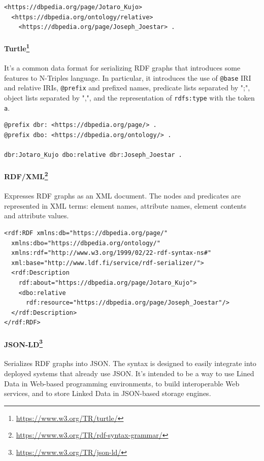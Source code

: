 \begin{verbatim}
<https://dbpedia.org/page/Jotaro_Kujo>
  <https://dbpedia.org/ontology/relative>
    <https://dbpedia.org/page/Joseph_Joestar> .
\end{verbatim}

\paragraph*{Turtle\footnote{\url{https://www.w3.org/TR/turtle/}}} It's a common data format for serializing \ac{RDF} graphs that introduces some features to N-Triples language. In particular, it introduces the use of \texttt{@base} \ac{IRI} and relative \acp{IRI}, \texttt{@prefix} and prefixed names, predicate lists separated by ";", object lists separated by ",", and the representation of \texttt{rdfs:type} with the token \texttt{a}.

\begin{verbatim}
@prefix dbr: <https://dbpedia.org/page/> .
@prefix dbo: <https://dbpedia.org/ontology/> .

dbr:Jotaro_Kujo dbo:relative dbr:Joseph_Joestar .
\end{verbatim}

\paragraph*{RDF/XML\footnote{\url{https://www.w3.org/TR/rdf-syntax-grammar/}}} Expresses \ac{RDF} graphs as an \acs{XML} document. The nodes and predicates are represented in \acs{XML} terms: element names, attribute names, element contents and attribute values.

\begin{verbatim}
<rdf:RDF xmlns:db="https://dbpedia.org/page/"
  xmlns:dbo="https://dbpedia.org/ontology/"
  xmlns:rdf="http://www.w3.org/1999/02/22-rdf-syntax-ns#"
  xml:base="http://www.ldf.fi/service/rdf-serializer/">
  <rdf:Description
    rdf:about="https://dbpedia.org/page/Jotaro_Kujo">
    <dbo:relative
      rdf:resource="https://dbpedia.org/page/Joseph_Joestar"/>
  </rdf:Description>
</rdf:RDF>    
\end{verbatim}

\paragraph*{JSON-LD\footnote{\url{https://www.w3.org/TR/json-ld/}}} Serializes \ac{RDF} graphs into \ac{JSON}. The syntax is designed to easily integrate into deployed systems that already use \ac{JSON}. It's intended to be a way to use Lined Data in Web-based programming environments, to build interoperable Web services, and to store Linked Data in \ac{JSON}-based storage engines.

